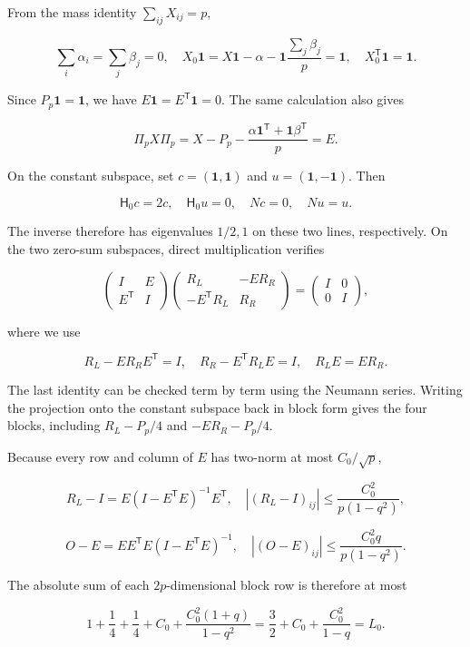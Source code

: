 \documentclass[11pt,a4paper]{article}
\begin{document}
From the mass identity \(\sum_{ij}X_{ij}=p\),

\[
\sum_i\alpha_i=\sum_j\beta_j=0,
\quad X_0\mathbf1=X\mathbf1-\alpha-\mathbf1\frac{\sum_j\beta_j}p=\mathbf1,
\quad X_0^{\mathsf T}\mathbf1=\mathbf1.
\]

Since \(P_p\mathbf1=\mathbf1\), we have \(E\mathbf1=E^{\mathsf T}\mathbf1=0\). The same calculation also gives

\[
\Pi_pX\Pi_p=X-P_p-\frac{\alpha\mathbf1^{\mathsf T}+\mathbf1\beta^{\mathsf T}}p=E.
\]

On the constant subspace, set \(c=(\mathbf1,\mathbf1)\) and \(u=(\mathbf1,-\mathbf1)\). Then

\[
\mathsf H_0c=2c,\quad\mathsf H_0u=0,\quad Nc=0,\quad Nu=u.
\]

The inverse therefore has eigenvalues \(1/2,1\) on these two lines, respectively. On the two zero-sum subspaces, direct multiplication verifies

\[
\begin{pmatrix}I&E\\E^{\mathsf T}&I\end{pmatrix}
\begin{pmatrix}R_L&-ER_R\\-E^{\mathsf T}R_L&R_R\end{pmatrix}
=\begin{pmatrix}I&0\\0&I\end{pmatrix},
\]

where we use

\[
R_L-ER_RE^{\mathsf T}=I,\quad R_R-E^{\mathsf T}R_LE=I,
\quad R_LE=ER_R.
\]

The last identity can be checked term by term using the Neumann series. Writing the projection onto the constant subspace back in block form gives the four blocks, including \(R_L-P_p/4\) and \(-ER_R-P_p/4\).

Because every row and column of \(E\) has two-norm at most \(C_0/\sqrt p\),

\[
R_L-I=E(I-E^{\mathsf T}E)^{-1}E^{\mathsf T},
\quad |(R_L-I)_{ij}|\le\frac{C_0^2}{p(1-q^2)},
\]

\[
O-E=EE^{\mathsf T}E(I-E^{\mathsf T}E)^{-1},
\quad |(O-E)_{ij}|\le\frac{C_0^2q}{p(1-q^2)}.
\]

The absolute sum of each \(2p\)-dimensional block row is therefore at most

\[
1+\frac14+\frac14+C_0+
\frac{C_0^2(1+q)}{1-q^2}
=\frac32+C_0+\frac{C_0^2}{1-q}=L_0.
\]
\end{document}
